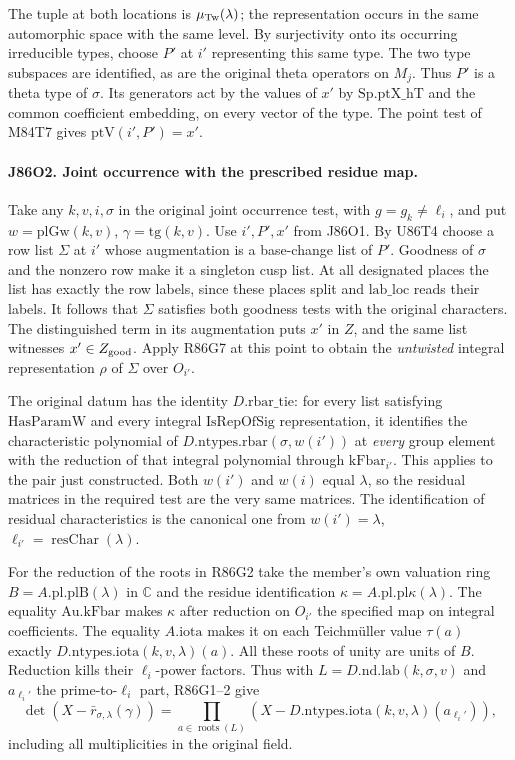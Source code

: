 The tuple at both locations is $\mu_{\rm Tw}(\lambda)$; the
representation occurs in the same automorphic space with the same
level. By surjectivity onto its occurring irreducible types, choose
$P'$ at $i'$ representing this same type. The two type subspaces are
identified, as are the original theta operators on $M_j$. Thus
$P'$ is a theta type of $\sigma$. Its generators act by the
values of $x'$ by $\mathrm{Sp.ptX\_hT}$ and the common coefficient
embedding, on every vector of the type. The point test of M84T7
gives $\mathrm{ptV}(i',P')=x'$.

\paragraph{J86O2. Joint occurrence with the prescribed residue map.}
Take any $k,v,i,\sigma$ in the original joint occurrence test,
with $g=g_k\ne\ell_i$, and put $w=\mathrm{plGw}(k,v)$,
$\gamma=\mathrm{tg}(k,v)$. Use $i',P',x'$ from J86O1.
By U86T4 choose a row list $\Sigma$ at $i'$ whose augmentation
is a base-change list of $P'$. Goodness of $\sigma$ and the
nonzero row make it a singleton cusp list. At all designated
places the list has exactly the row labels, since these places
split and $\mathrm{lab\_loc}$ reads their labels. It follows that
$\Sigma$ satisfies both goodness tests with the original characters.
The distinguished term in its augmentation puts $x'$ in $Z$,
and the same list witnesses $x'\in Z_{\rm good}$. Apply R86G7 at
this point to obtain the \emph{untwisted} integral representation
$\rho$ of $\Sigma$ over $O_{i'}$.

The original datum has the identity $D.\mathrm{rbar\_tie}$:
for every list satisfying $\mathrm{HasParamW}$ and every integral
$\mathrm{IsRepOfSig}$ representation, it identifies the
characteristic polynomial of $D.\mathrm{ntypes.rbar}(\sigma,w(i'))$
at \emph{every} group element with the reduction of that integral
polynomial through $\mathrm{kFbar}_{i'}$. This applies to the pair
just constructed. Both $w(i')$ and $w(i)$ equal $\lambda$, so the
residual matrices in the required test are the very same matrices.
The identification of residual characteristics is the canonical one
from $w(i')=\lambda$, $\ell_{i'}=\operatorname{resChar}(\lambda)$.

For the reduction of the roots in R86G2 take the member's own
valuation ring $B=A.\mathrm{pl.plB}(\lambda)$ in $\mathbb C$ and
the residue identification $\kappa=A.\mathrm{pl.pl}\kappa(\lambda)$.
The equality $\mathrm{Au.kFbar}$ makes $\kappa$ after reduction
on $O_{i'}$ the specified map on integral coefficients.
The equality $A.\mathrm{iota}$ makes it on each Teichm\"uller
value $\tau(a)$ exactly $D.\mathrm{ntypes.iota}(k,v,\lambda)(a)$.
All these roots of unity are units of $B$. Reduction kills their
$\ell_i$-power factors. Thus with $L=D.\mathrm{nd.lab}(k,\sigma,v)$
and $a_{\ell_i'}$ the prime-to-$\ell_i$ part, R86G1--2 give
\[
 \det\!\left(X-\bar r_{\sigma,\lambda}(\gamma)\right)
   =\prod_{a\in\operatorname{roots}(L)}
        \left(X-D.\mathrm{ntypes.iota}(k,v,\lambda)(a_{\ell_i'})\right),
\]
including all multiplicities in the original field.

